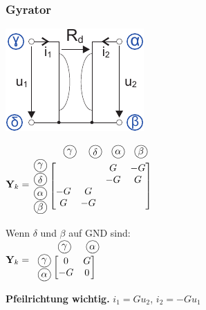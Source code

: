 \documentclass[a4paper,twocolumn,10pt]{article}
\newcommand*\kreis[1]{\unitlength1ex\begin{picture}(2.5,2.5)%
\put(0.75,0.75){\circle{3}}\put(0.7,0.7){\makebox(0,0){#1}}\end{picture}}
\begin{document}
\subsubsection*{Gyrator}
\begin{minipage}[b]{0.18\textwidth}
\includegraphics[width=\textwidth]{img/KSA_Gyrator}
\end{minipage}
\hfill
\begin{minipage}[b]{0.30\textwidth}
$\textbf{Y}_k=\;\;\begin{matrix}\begin{matrix} \;\;\; & \;\;\;\kreis{$\gamma$} & \;\;\kreis{$\delta$} & \;\kreis{$\alpha$} & \;\kreis{$\beta$} \end{matrix}\\\begin{matrix} \kreis{$\gamma$} \\ \kreis{$\delta$} \\ \kreis{$\alpha$} \\ \kreis{$\beta$} \end{matrix} \left[\begin{matrix}  &  & G & -G \\  &  & -G & G \\ -G & G & & \\ G & -G & & \end{matrix}\right]\\ \; \end{matrix}$\\
Wenn $\delta$ und $\beta$ auf GND sind:\\
$\textbf{Y}_k=\begin{matrix}\begin{matrix}\;\;\;\;\;\;\;\;\;\;\;\kreis{$\gamma$}&\;\;\;\kreis{$\alpha$} \end{matrix}\\\;\;\begin{matrix} \kreis{$\gamma$} \\ \kreis{$\alpha$} \end{matrix} \left[\begin{matrix} 0 & G \\-G & 0 \end{matrix}\right]
\end{matrix}$
\end{minipage}
\textbf{Pfeilrichtung wichtig.} 
$i_1=Gu_2$, $i_2=-Gu_1$
\end{document}
